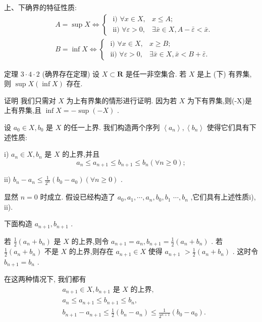 上、下确界的特征性质:
\begin{align*}
	&A = \sup X \Leftrightarrow  \left\{  \begin{array}{ll} \text{ i) }\forall x \in  X, & x \leq  A; \\  \text{ ii) }\forall \varepsilon  > 0, & \exists \bar{x} \in  X,A - \bar{\varepsilon } < \bar{x}. \end{array}\right.\\
	&B = \inf X \Leftrightarrow  \left\{  \begin{array}{ll} \text{ i) }\forall x \in  X, & x \geq  B; \\  \text{ ii) }\forall \varepsilon  > 0, & \exists \bar{x} \in  X,\bar{x} < B + \bar{\varepsilon }. \end{array}\right.
\end{align*}

定理 $3 \cdot  4 \cdot  2$ (确界存在定理) 设 $X \subset  \mathbf{R}$ 是任一非空集合. 若 $X$ 是上 (下) 有界集,则 $\sup X\left( {\inf X}\right)$ 存在.

证明 我们只需对 $X$ 为上有界集的情形进行证明. 因为若 $X$ 为下有界集,则(-X)是上有界集,且 $\inf X =  - \sup \left( {-X}\right)$ .

设 ${a}_{0} \in  X,{b}_{0}$ 是 $X$ 的任一上界. 我们构造两个序列 $\left\langle  {a}_{n}\right\rangle  ,\left\langle  {b}_{n}\right\rangle$ 使得它们具有下述性质:

i) ${a}_{n} \in  X,{b}_{n}$ 是 $X$ 的上界,并且
$${a}_{n} \leq  {a}_{n + 1} \leq  {b}_{n + 1} \leq  {b}_{n}\left( {\forall n \geq  0}\right) ;$$

ii) ${b}_{n} - {a}_{n} \leq  \frac{1}{{2}^{n}}\left( {{b}_{0} - {a}_{0}}\right) \left( {\forall n \geq  0}\right)$ .

显然 $n = 0$ 时成立. 假设已经构造了 ${a}_{0},{a}_{1},\cdots ,{a}_{n},{b}_{0},{b}_{1}$  $\cdots ,{b}_{n}$ ,它们具有上述性质i), ii).

下面构造 ${a}_{n + 1},{b}_{n + 1}$ .

若 $\frac{1}{2}\left( {{a}_{n} + {b}_{n}}\right)$ 是 $X$ 的上界,则令 ${a}_{n + 1} = {a}_{n},{b}_{n + 1} = \frac{1}{2}\left( {{a}_{n} + {b}_{n}}\right)$ . 若 $\frac{1}{2}\left( {{a}_{n} + {b}_{n}}\right)$ 不是 $X$ 的上界,则存在 ${a}_{n + 1} \in  X$ 使得 ${a}_{n + 1}$  $> \frac{1}{2}\left( {{a}_{n} + {b}_{n}}\right)$ . 这时令 ${b}_{n + 1} = {b}_{n}$ .

在这两种情况下, 我们都有
\begin{align*}
	&{a}_{n + 1} \in  X,{b}_{n + 1}\text{ 是 }X\text{ 的上界, }\\
	&{a}_{n} \leq  {a}_{n + 1} \leq  {b}_{n + 1} \leq  {b}_{n},\\
	&{b}_{n + 1} - {a}_{n + 1} \leq  \frac{1}{2}\left( {{b}_{n} - {a}_{n}}\right)  \leq  \frac{1}{{2}^{n + 1}}\left( {{b}_{0} - {a}_{0}}\right) .
\end{align*}

